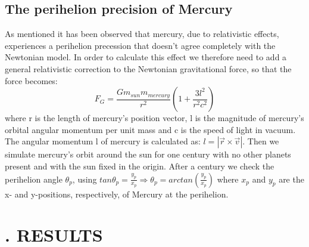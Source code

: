 \documentclass[twocolumn]{article}
\begin{document}
\subsection*{The perihelion precision of Mercury}
As mentioned it has been observed that mercury, due to relativistic effects, experiences a perihelion precession that doesn't agree completely with the Newtonian model. In order to calculate this effect we therefore need to add a general relativistic correction to the Newtonian gravitational force, so that the force becomes:
$$ F_G = \frac{G m_{sun} m_{mercury}}{r^2}(1 + \frac{3l^2}{r^2c^2}) $$
where r is the length of mercury's position vector, l is the magnitude of mercury's orbital angular momentum per unit mass and c is the speed of light in vacuum. The angular momentum l of mercury is calculated as: $l = |\vec{r} \times \vec{v}|$.\newline
Then we simulate mercury's orbit around the sun for one century with no other planets present and with the sun fixed in the origin. After a century we check the perihelion angle $\theta_p$, using $tan\theta_p = \frac{y_p}{x_p} \Rightarrow \theta_p = arctan(\frac{y_p}{x_p})$ where $x_p$ and $y_p$ are the x- and y-positions, respectively, of Mercury at the perihelion.
\section*{. RESULTS}
\end{document}
